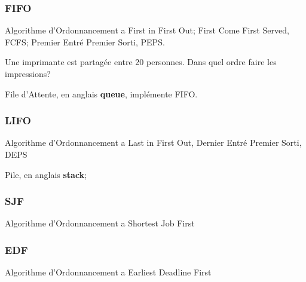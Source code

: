 \documentclass{article}
\begin{document}
\subsubsection{FIFO}
\begin{definition}
    Algorithme d'Ordonnancement a First in First Out; First Come First Served, FCFS; Premier Entré Premier Sorti, PEPS.

    \begin{example}
        Une imprimante est partagée entre 20 personnes. Dans quel ordre faire les impressions?
    \end{example}
    \begin{remark}\label{def:queue}
        File d'Attente, en anglais \textbf{queue}, implémente FIFO.
    \end{remark}
\end{definition}

\subsubsection{LIFO}
\begin{definition}
    Algorithme d'Ordonnancement a Last in First Out, Dernier Entré Premier Sorti, DEPS
        \begin{example}\label{def:stack}
            Pile, en anglais \textbf{stack};
        \end{example}
\end{definition}

\subsubsection{SJF}
\begin{definition}
    Algorithme d'Ordonnancement a Shortest Job First
\end{definition}

\subsubsection{EDF}
\begin{definition}
    Algorithme d'Ordonnancement a Earliest Deadline First
\end{definition}
\end{document}
